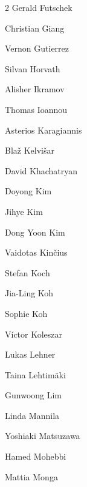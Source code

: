 \begin{multicols}{2}
   \ifdefined\AuthorFutschekGerald {} Gerald Futschek\fi

   \ifdefined\AuthorGiangChristian {} Christian Giang\fi

   \ifdefined\AuthorGutierrezVernon {} Vernon Gutierrez\fi

   \ifdefined\AuthorHorvathSilvan {} Silvan Horvath\fi

   \ifdefined\AuthorIkramovAlisher {} Alisher Ikramov\fi

   \ifdefined\AuthorIoannouThomas {} Thomas Ioannou\fi

   \ifdefined\AuthorKaragiannisAsterios {} Asterios Karagiannis\fi

   \ifdefined\AuthorKelvisarBlaz {} Blaž Kelvišar\fi

   \ifdefined\AuthorKhachatryanDavid {} David Khachatryan\fi

   \ifdefined\AuthorKimDoyong {} Doyong Kim\fi

   \ifdefined\AuthorKimJihye {} Jihye Kim\fi

   \ifdefined\AuthorKimYoonDong {} Dong Yoon Kim\fi

   \ifdefined\AuthorKinciusVaidotas {} Vaidotas Kinčius\fi

   \ifdefined\AuthorKochStefan {} Stefan Koch\fi

   \ifdefined\AuthorKohJiaLing {} Jia-Ling Koh\fi

   \ifdefined\AuthorKohSophie {} Sophie Koh\fi

   \ifdefined\AuthorKoleszarVictor {} Víctor Koleszar\fi

   \ifdefined\AuthorLehnerLukas {} Lukas Lehner\fi

   \ifdefined\AuthorLehtimakiTaina {} Taina Lehtimäki\fi

   \ifdefined\AuthorLimGunwoong {} Gunwoong Lim\fi

   \ifdefined\AuthorMannilaLinda {} Linda Mannila\fi

   \ifdefined\AuthorMatsuzawaYoshiaki {} Yoshiaki Matsuzawa\fi

   \ifdefined\AuthorMohebbiHamed {} Hamed Mohebbi\fi

   \ifdefined\AuthorMongaMattia {} Mattia Monga\fi


\end{multicols}
